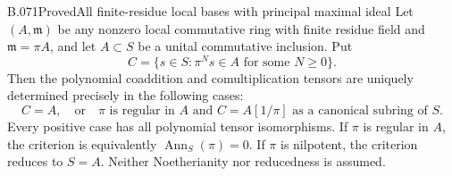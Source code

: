 \begin{saresult}{B.071}{Proved}{All finite-residue local bases with principal maximal ideal}
Let $(A,\mathfrak m)$ be any nonzero local commutative ring with finite
residue field and $\mathfrak m=\pi A$, and let $A\subset S$ be a unital
commutative inclusion. Put
\[
                  C=\{s\in S:\pi^Ns\in A
                                  \text{ for some }N\ge0\}.
\]
Then the polynomial coaddition and comultiplication tensors are uniquely
determined precisely in the following cases:
\[
 C=A,\quad\text{or}\quad
 \pi\text{ is regular in }A\text{ and }C=A[1/\pi]
 \text{ as a canonical subring of }S.                     \tag{B71.1}
\]
Every positive case has all polynomial tensor isomorphisms.
If $\pi$ is regular in $A$, the criterion is equivalently
$\operatorname{Ann}_S(\pi)=0$.
If $\pi$ is nilpotent, the criterion reduces to $S=A$.
Neither Noetherianity nor reducedness is assumed.
\end{saresult}
